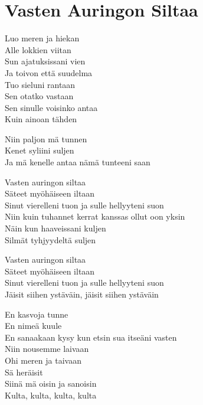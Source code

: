 \section{Vasten Auringon Siltaa}
Luo meren ja hiekan\\
Alle lokkien viitan\\
Sun ajatuksissani vien\\
Ja toivon että suudelma\\
Tuo sieluni rantaan\\
Sen otatko vastaan\\
Sen sinulle voisinko antaa\\
Kuin ainoan tähden

Niin paljon mä tunnen\\
Kenet syliini suljen\\
Ja mä kenelle antaa nämä tunteeni saan

Vasten auringon siltaa\\
Säteet myöhäiseen iltaan\\
Sinut vierelleni tuon ja sulle hellyyteni suon\\
Niin kuin tuhannet kerrat kanssas ollut oon yksin\\
Näin kun haaveissani kuljen\\
Silmät tyhjyydeltä suljen

Vasten auringon siltaa\\
Säteet myöhäiseen iltaan\\
Sinut vierelleni tuon ja sulle hellyyteni suon\\
Jäisit siihen ystäväin, jäisit siihen ystäväin

En kasvoja tunne\\
En nimeä kuule\\
En sanaakaan kysy kun etsin sua itseäni vasten\\
Niin nousemme laivaan\\
Ohi meren ja taivaan\\
Sä heräisit\\
Siinä mä oisin ja sanoisin\\
Kulta, kulta, kulta, kulta